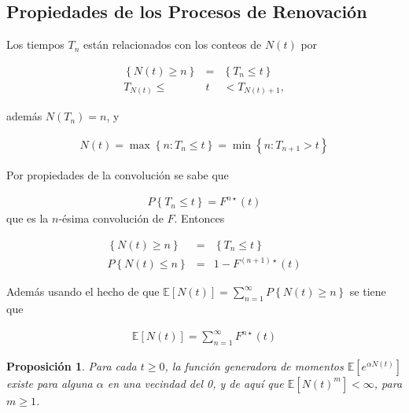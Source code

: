 \documentclass{article}
\newtheorem{Prop}{Proposición}
\newcommand{\esp}{\mathbb{E}}
\begin{document}
%
\subsection{Propiedades de los Procesos de Renovaci\'on}
%

Los tiempos $T_{n}$ est\'an relacionados con los conteos de $N\left(t\right)$ por

\begin{eqnarray*}
\left\{N\left(t\right)\geq n\right\}&=&\left\{T_{n}\leq t\right\}\\
T_{N\left(t\right)}\leq &t&<T_{N\left(t\right)+1},
\end{eqnarray*}

adem\'as $N\left(T_{n}\right)=n$, y 

\begin{eqnarray*}
N\left(t\right)=\max\left\{n:T_{n}\leq t\right\}=\min\left\{n:T_{n+1}>t\right\}
\end{eqnarray*}

Por propiedades de la convoluci\'on se sabe que

\begin{eqnarray*}
P\left\{T_{n}\leq t\right\}=F^{n\star}\left(t\right)
\end{eqnarray*}
que es la $n$-\'esima convoluci\'on de $F$. Entonces 

\begin{eqnarray*}
\left\{N\left(t\right)\geq n\right\}&=&\left\{T_{n}\leq t\right\}\\
P\left\{N\left(t\right)\leq n\right\}&=&1-F^{\left(n+1\right)\star}\left(t\right)
\end{eqnarray*}

Adem\'as usando el hecho de que $\esp\left[N\left(t\right)\right]=\sum_{n=1}^{\infty}P\left\{N\left(t\right)\geq n\right\}$
se tiene que

\begin{eqnarray*}
\esp\left[N\left(t\right)\right]=\sum_{n=1}^{\infty}F^{n\star}\left(t\right)
\end{eqnarray*}

\begin{Prop}
Para cada $t\geq0$, la funci\'on generadora de momentos $\esp\left[e^{\alpha N\left(t\right)}\right]$ existe para alguna $\alpha$ en una vecindad del 0, y de aqu\'i que $\esp\left[N\left(t\right)^{m}\right]<\infty$, para $m\geq1$.
\end{Prop}
\end{document}
